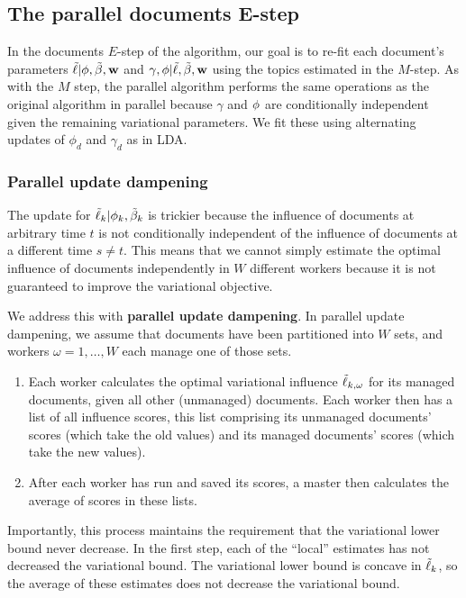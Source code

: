 \subsection*{The parallel documents E-step}
In the documents $E$-step of the algorithm, our goal is to re-fit each
document's parameters $\tilde{\ell} | \phi, \tilde{\beta}, \textbf{w} $ and $\gamma, \phi |
\tilde{\ell}, \tilde{\beta}, \textbf{w}$ using the topics estimated in the $M$-step.  As with
the $M$ step, the parallel algorithm performs the same operations as
the original algorithm in parallel because $\gamma$ and $\phi$ are
conditionally independent given the remaining variational parameters.
We fit these using alternating updates of $\phi_{d}$ and $\gamma_d$ as
in LDA.

\subsubsection*{Parallel update dampening}

The update for $\tilde{\ell}_{k} | \phi_k, \tilde{\beta}_k$ is trickier because the
influence of documents at arbitrary time $t$ is not conditionally
independent of the influence of documents at a different time $s \neq
t$.  This means that we cannot simply estimate the optimal influence
of documents independently in $W$ different workers because it is not
guaranteed to improve the variational objective.

We address this with \textbf{parallel update dampening}.  In parallel
update dampening, we assume that documents have been partitioned into
$W$ sets, and workers $\omega = 1, \ldots, W$ each manage one of those
sets.

\begin{enumerate}
\item Each worker calculates the optimal variational influence
  $\tilde{\ell}_{k,\omega}$ for its managed documents, given all other
  (unmanaged) documents.  Each worker then has a list of all influence
  scores, this list comprising its unmanaged documents' scores (which take the
  old values) and its managed documents' scores (which take the new
  values).
  
\item After each worker has run and saved its scores, a master then
  calculates the average of scores in these lists.
\end{enumerate}
Importantly, this process maintains the requirement that the
variational lower bound never decrease.  In the first step, each of
the ``local'' estimates has not decreased the variational bound.  The
variational lower bound is concave in $\tilde{\ell}_{k}$, so the average of
these estimates does not decrease the variational bound.

